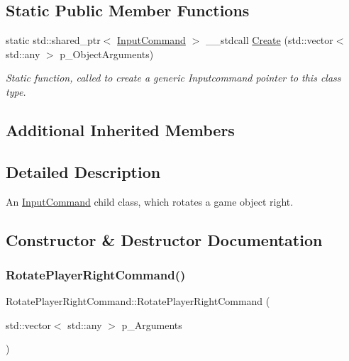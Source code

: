 \subsection*{Static Public Member Functions}
\begin{DoxyCompactItemize}
\item 
static std\+::shared\+\_\+ptr$<$ \mbox{\hyperlink{class_input_command}{Input\+Command}} $>$ \+\_\+\+\_\+stdcall \mbox{\hyperlink{class_rotate_player_right_command_ae26d714e86d5a851d647774494ab9841}{Create}} (std\+::vector$<$ std\+::any $>$ p\+\_\+\+Object\+Arguments)
\begin{DoxyCompactList}\small\item\em Static function, called to create a generic Inputcommand pointer to this class type. \end{DoxyCompactList}\end{DoxyCompactItemize}
\subsection*{Additional Inherited Members}


\subsection{Detailed Description}
An \mbox{\hyperlink{class_input_command}{Input\+Command}} child class, which rotates a game object right. 

\subsection{Constructor \& Destructor Documentation}
\mbox{\label{class_rotate_player_right_command_a039e4818400e092298cbc8eda45eae2e}} 
\subsubsection{\texorpdfstring{RotatePlayerRightCommand()}{RotatePlayerRightCommand()}}
{\footnotesize\ttfamily Rotate\+Player\+Right\+Command\+::\+Rotate\+Player\+Right\+Command (\begin{DoxyParamCaption}\item[{std\+::vector$<$ std\+::any $>$}]{p\+\_\+\+Arguments }\end{DoxyParamCaption})\hspace{0.3cm}{\ttfamily [inline]}}



